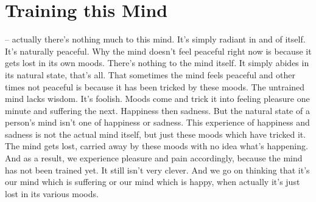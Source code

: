 
\renewcommand{\chapterFootnotemark}{\footnotemark}
\renewcommand{\chapterFootnotetext}{\footnotetext{\textit{Note}: A different translation of this talk has been published elsewhere under the title: `\textit{About This Mind}'}}

\chapter{Training this Mind}

 -- actually there's nothing much to this mind. It's simply radiant in and of itself. It's naturally peaceful. Why the mind doesn't feel peaceful right now is because it gets lost in its own moods. There's nothing to the mind itself. It simply abides in its natural state, that's all. That sometimes the mind feels peaceful and other times not peaceful is because it has been tricked by these moods. The untrained mind lacks wisdom. It's foolish. Moods come and trick it into feeling pleasure one minute and suffering the next. Happiness then sadness. But the natural state of a person's mind isn't one of happiness or sadness. This experience of happiness and sadness is not the actual mind itself, but just these moods which have tricked it. The mind gets lost, carried away by these moods with no idea what's happening. And as a result, we experience pleasure and pain accordingly, because the mind has not been trained yet. It still isn't very clever. And we go on thinking that it's our mind which is suffering or our mind which is happy, when actually it's just lost in its various moods. 

